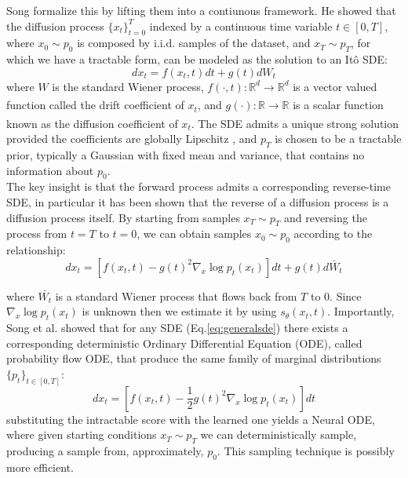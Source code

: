 Song \cite{song2021score} formalize this by lifting them into a contiunous framework. He showed that the diffusion process \(\{x_t\}_{t=0}^T\) indexed by a continuous time variable \(t\in[0,T]\), where \(x_0\sim p_0\) is composed by i.i.d. samples of the dataset, and \(x_T\sim p_T\), for which we have a tractable form, can be modeled as the solution to an Itô SDE:
\begin{equation}
    \label{eq:generalsde}
    dx_t=f(x_t,t)dt+g(t)dW_t
\end{equation}
where \(W\) is the standard Wiener process, \(f(\cdot,t):\mathbb{R}^d\xrightarrow[]{}\mathbb{R}^d\) is a vector valued function called the drift coefficient of \(x_t\), and \(g(\cdot):\mathbb{R}\xrightarrow[]{}\mathbb{R}\) is a scalar function known as
the diffusion coefficient of \(x_t\). The SDE admits a unique strong solution provided the coefficients are globally Lipschitz \cite{oksendal2003stochastic}, and \(p_T\) is chosen to be a tractable prior, typically a Gaussian with fixed mean and variance, that contains no information about \(p_0\).\\

The key insight is that the forward process admits a corresponding reverse-time SDE, in particular it has been shown \cite{anderson1982reversetime} that the reverse of a diffusion process is a diffusion process itself. By starting from samples \(x_T \sim p_T\) and reversing the process from \(t=T\) to \(t=0\), we can obtain samples \(x_0\sim p_0\) according to the relationship:
\begin{equation}
    \label{eq:reverse_sde}
    dx_t=\left[f(x_t, t)-g(t)^2\nabla_x\log p_t(x_t)\right]dt + g(t)d\bar{W}_t
\end{equation}

where \(\bar{W_t}\) is a standard Wiener process that flows back from \(T\) to \(0\). Since \(\nabla_x\log p_t(x_t)\) is unknown then we estimate it by using \(s_\theta(x_t,t)\). Importantly, Song et al. \cite{song2021score} showed that for any SDE (Eq.\ref{eq:generalsde}) there exists a corresponding deterministic Ordinary Differential Equation (ODE), called probability flow ODE, that produce the same family of marginal distributions \(\{p_t\}_{t\in[0,T]}\):
$$
dx_t=\left[f(x_t,t)-\frac12g(t)^2\nabla_x\log p_t(x_t)\right]dt
$$
substituting the intractable score with the learned one yields a Neural ODE, where given starting conditions $x_T\sim p_T$ we can deterministically sample, producing a sample from, approximately, \(p_0\). This sampling technique is possibly more efficient.\\

